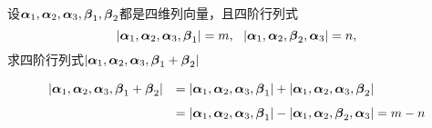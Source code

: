 \begin{frame}
  
    \begin{li}
      设$\alphabd_1,\alphabd_2,\alphabd_3,\betabd_1,\betabd_2$都是四维列向量，且四阶行列式
      $$
      |\alphabd_1,\alphabd_2,\alphabd_3,\betabd_1|=m,~~
      |\alphabd_1,\alphabd_2,\betabd_2,\alphabd_3|=n,      
      $$
      求四阶行列式$|\alphabd_1,\alphabd_2,\alphabd_3,\betabd_1+\betabd_2|$
    \end{li}
    \pause

    \begin{jie}
    $$
    \begin{array}{rl}
      |\alphabd_1,\alphabd_2,\alphabd_3,\betabd_1+\betabd_2|&=
      |\alphabd_1,\alphabd_2,\alphabd_3,\betabd_1|+
      |\alphabd_1,\alphabd_2,\alphabd_3,\betabd_2|\\[0.1in]
      &=
      |\alphabd_1,\alphabd_2,\alphabd_3,\betabd_1|-
      |\alphabd_1,\alphabd_2,\betabd_2,\alphabd_3|=m-n
    \end{array}
    $$
  \end{jie}
\end{frame}


